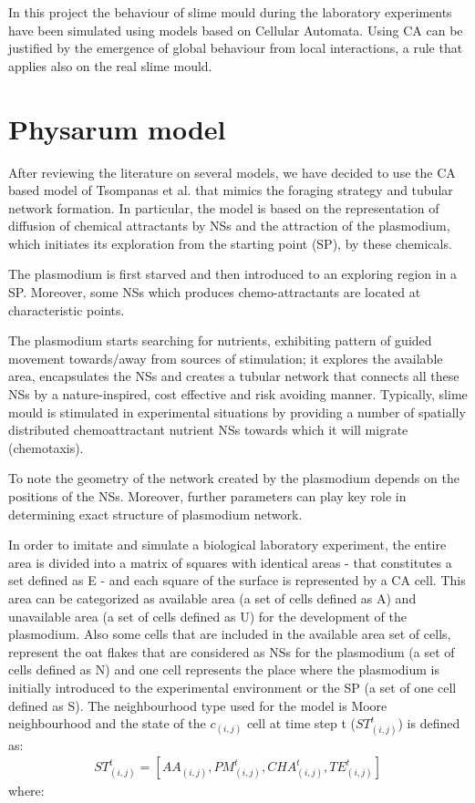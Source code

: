 In this project the behaviour of slime mould during the laboratory experiments have been simulated using models based on Cellular Automata. Using CA can be justified by the emergence of global behaviour from local interactions, a rule that applies also on the real slime mould.

\section{Physarum model}

After reviewing the literature on several models, we have decided to use the CA based model of Tsompanas et al. \cite{Tsompanas2016} that mimics the foraging strategy and tubular network formation. In particular, the model is based on the representation of diffusion of chemical attractants by NSs and the attraction of the plasmodium, which initiates its exploration from the starting point (SP), by these chemicals. 

\par
The plasmodium is first starved and then introduced to an exploring region in a SP. Moreover, some NSs which produces chemo-attractants are located at characteristic points. 

\par
The plasmodium starts searching for nutrients, exhibiting pattern of guided movement towards/away from sources of stimulation; it explores the available area, encapsulates the NSs and creates a tubular network that connects all these NSs by a nature-inspired, cost effective and risk avoiding manner.
Typically, slime mould is stimulated in experimental situations by providing a number of spatially distributed chemoattractant nutrient NSs towards which it will migrate (chemotaxis).

\par
To note the geometry of the network created by the plasmodium depends on the positions of the NSs. Moreover, further parameters can play key role in determining exact structure of plasmodium network.

\par
In order to imitate and simulate a biological laboratory experiment, the entire area is divided into a matrix of squares with identical areas - that constitutes a set defined as E - and each square of the surface is represented by a CA cell.
This area can be categorized as available area (a set of cells defined as A) and unavailable area (a set of cells defined as U) for the development of the plasmodium.
Also some cells that are included in the available area set of cells, represent the oat flakes that are considered as NSs for the plasmodium (a set of cells defined as N) and one cell represents the place where the plasmodium is initially introduced to the
experimental environment or the SP (a set of one cell defined as S).
The neighbourhood type used for the model is Moore neighbourhood and the state of the $c_{(i, j)}$ cell at time step t ($ ST^t_{(i, j)}$) is defined as:
\begin{align}
ST^t_{(i, j)} = [AA_{(i, j)}, PM^t_{(i, j)}, CHA^t_{(i, j)}, TE^t_{(i, j)}]
\end{align}
where:

